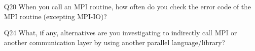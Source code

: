 \begin{description}%
\item{Q20} When you call an MPI routine, how often do you check the error code of the MPI routine  (excepting MPI-IO)?%
\item{Q24} What, if any, alternatives are you investigating to indirectly call MPI or another communication layer by using another parallel language/library?%
\end{description}%
